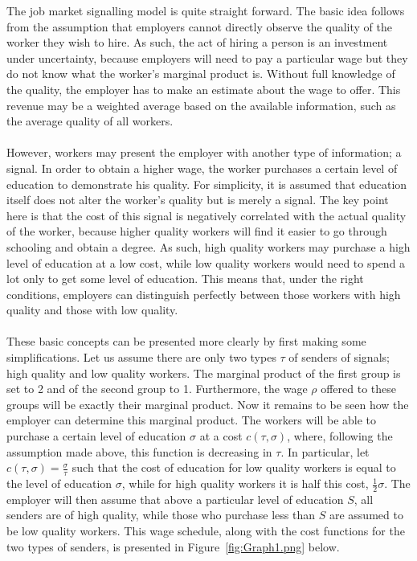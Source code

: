 \documentclass[a4paper,10pt]{article}
\numberwithin{equation}{section}
\begin{document}
The job market signalling model is quite straight forward. The basic idea follows from the assumption that employers cannot directly observe the quality of the worker they wish to hire. As such, the act of hiring a person is an investment under uncertainty, because employers will need to pay a particular wage but they do not know what the worker's marginal product is. Without full knowledge of the quality, the employer has to make an estimate about the wage to offer. This revenue may be a weighted average based on the available information, such as the average quality of all workers.\\
\\
However, workers may present the employer with another type of information; a signal. In order to obtain a higher wage, the worker purchases a certain level of education to demonstrate his quality. For simplicity, it is assumed that education itself does not alter the worker's quality but is merely a signal. The key point here is that the cost of this signal is negatively correlated with the actual quality of the worker, because higher quality workers will find it easier to go through schooling and obtain a degree. As such, high quality workers may purchase a high level of education at a low cost, while low quality workers would need to spend a lot only to get some level of education. This means that, under the right conditions, employers can distinguish perfectly between those workers with high quality and those with low quality.\\
\\
These basic concepts can be presented more clearly by first making some simplifications. Let us assume there are only two types $\tau$ of senders of signals; high quality and low quality workers. The marginal product of the first group is set to 2 and of the second group to 1. Furthermore, the wage $\rho$ offered to these groups will be exactly their marginal product. Now it remains to be seen how the employer can determine this marginal product. The workers will be able to purchase a certain level of education $\sigma$ at a cost $c(\tau,\sigma)$, where, following the assumption made above, this function is decreasing in $\tau$. In particular, let $c(\tau,\sigma)=\frac{\sigma}{\tau}$ such that the cost of education for low quality workers is equal to the level of education $\sigma$, while for high quality workers it is half this cost, $\frac{1}{2}\sigma$. The employer will then assume that above a particular level of education $S$, all senders are of high quality, while those who purchase less than $S$ are assumed to be low quality workers. This wage schedule, along with the cost functions for the two types of senders, is presented in Figure~\ref{fig:Graph1.png} below.\\
\end{document}
